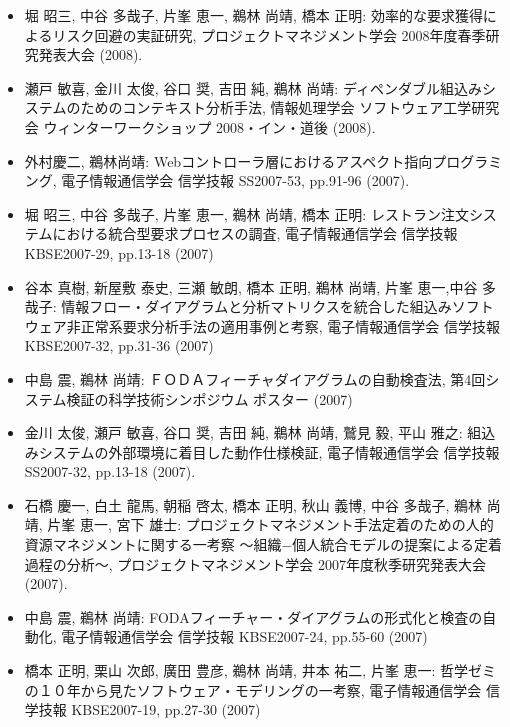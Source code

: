 \documentclass{jarticle}
\begin{document}
\begin{itemize}
\item 堀 昭三, 中谷 多哉子, 片峯 恵一, 鵜林 尚靖, 橋本 正明:
効率的な要求獲得によるリスク回避の実証研究,
プロジェクトマネジメント学会 2008年度春季研究発表大会 (2008).

\item 瀬戸 敏喜, 金川 太俊, 谷口 奨, 吉田 純, 鵜林 尚靖:
ディペンダブル組込みシステムのためのコンテキスト分析手法,
情報処理学会 ソフトウェア工学研究会 ウィンターワークショップ 2008・イン・道後 (2008).

\item 外村慶二, 鵜林尚靖:
Webコントローラ層におけるアスペクト指向プログラミング,
電子情報通信学会 信学技報 SS2007-53, pp.91-96 (2007).

\item 堀 昭三, 中谷 多哉子, 片峯 恵一, 鵜林 尚靖, 橋本 正明:
レストラン注文システムにおける統合型要求プロセスの調査,
電子情報通信学会 信学技報 KBSE2007-29, pp.13-18 (2007)

\item 谷本 真樹, 新屋敷 泰史, 三瀬 敏朗, 橋本 正明, 鵜林 尚靖, 片峯 恵一,中谷 多哉子:
情報フロー・ダイアグラムと分析マトリクスを統合した組込みソフトウェア非正常系要求分析手法の適用事例と考察,
電子情報通信学会 信学技報 KBSE2007-32, pp.31-36 (2007)

\item 中島 震, 鵜林 尚靖:
ＦＯＤＡフィーチャダイアグラムの自動検査法,
第4回システム検証の科学技術シンポジウム ポスター (2007)

\item 金川 太俊, 瀬戸 敏喜, 谷口 奨, 吉田 純, 鵜林 尚靖, 鷲見 毅, 平山 雅之:
組込みシステムの外部環境に着目した動作仕様検証,
電子情報通信学会 信学技報 SS2007-32, pp.13-18 (2007).

\item 石橋 慶一, 白土 龍馬, 朝稲 啓太, 橋本 正明, 秋山 義博, 中谷 多哉子, 鵜林 尚靖, 片峯 恵一, 宮下 雄士:
プロジェクトマネジメント手法定着のための人的資源マネジメントに関する一考察 〜組織−個人統合モデルの提案による定着過程の分析〜,
プロジェクトマネジメント学会 2007年度秋季研究発表大会 (2007).

\item 中島 震, 鵜林 尚靖:
FODAフィーチャー・ダイアグラムの形式化と検査の自動化,
電子情報通信学会 信学技報 KBSE2007-24, pp.55-60 (2007)

\item 橋本 正明, 栗山 次郎, 廣田 豊彦, 鵜林 尚靖, 井本 祐二, 片峯 恵一:
哲学ゼミの１０年から見たソフトウェア・モデリングの一考察,
電子情報通信学会 信学技報 KBSE2007-19, pp.27-30 (2007)


\end{itemize}
\end{document}

